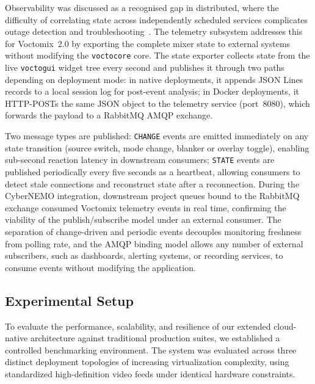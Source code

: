 \documentclass[electronics,article,submit,pdftex,moreauthors]{Definitions/mdpi}
\begin{document}

Observability was discussed as a recognised gap in distributed, where the difficulty of correlating state across independently scheduled services complicates outage detection and troubleshooting~\cite{usman2022_observability_microservices}. The telemetry subsystem addresses this for Voctomix~2.0 by exporting the complete mixer state to external systems without modifying the
\texttt{voctocore} core. The state exporter collects state from the live \texttt{voctogui} widget tree every second and publishes it through two paths depending on deployment mode: in native deployments, it appends JSON Lines records to a local session log for post-event analysis; in Docker deployments, it HTTP-POSTs
the same JSON object to the telemetry service (port~8080), which forwards the payload to a RabbitMQ AMQP exchange.

Two message types are published: \texttt{CHANGE} events are emitted immediately on any state transition (source switch, mode change, blanker or overlay toggle), enabling sub-second reaction latency in downstream consumers; \texttt{STATE} events are published periodically every five seconds as a heartbeat, allowing consumers to detect stale connections and reconstruct state after a reconnection. During the CyberNEMO integration, downstream project queues bound to the RabbitMQ exchange consumed Voctomix telemetry events in real time, confirming
the viability of the publish/subscribe model under an external consumer. The separation of change-driven and periodic events decouples monitoring freshness from polling rate, and the AMQP binding model allows any number
of external subscribers, such as dashboards, alerting systems, or recording services, to consume events without modifying the application.

\subsection{Experimental Setup}

To evaluate the performance, scalability, and resilience of our extended cloud-native architecture against traditional production suites, we established a controlled benchmarking environment. The system was evaluated across three distinct deployment topologies of increasing virtualization complexity, using standardized high-definition video feeds under identical hardware constraints.
\end{document}
